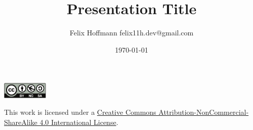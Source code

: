 \documentclass[xcolor=svgnames,11pt]{beamer}
\title {Presentation Title}
\author[Felix Hoffmann]{%
  Felix Hoffmann \vspace{0.25cm} \newline %
  \small felix11h.dev@gmail.com %
}
\institute[]{}
\date{\today}
\begin{document}


\begin{frame} 
  \titlepage
\end{frame}

\begin{frame}
  \begin{center} 

    \vspace{5.95cm}

    \includegraphics[width=2.2cm]{by-nc-sa_eu-eps-converted-to.pdf}

    \vspace{0.25cm}

    \small
    This work is licensed under a
    \href{http://creativecommons.org/licenses/by-nc-sa/4.0/}{Creative
      Commons Attribution-NonCommercial-ShareAlike 4.0 International
      License}.

  \end{center}
\end{frame}
\end{document}
